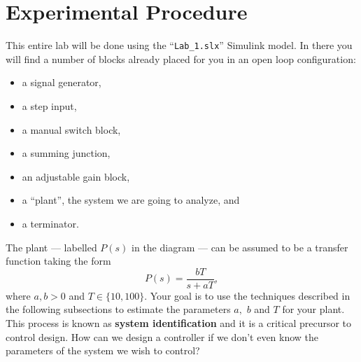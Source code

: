 \section{Experimental Procedure}
This entire lab will be done using the ``\texttt{Lab\_1.slx}'' Simulink model.
In there you will
find a number of blocks already placed for you in an open loop configuration:
\begin{itemize}
  \item{a signal generator,}
  \item{a step input,}
  \item{a manual switch block,}
  \item{a summing junction,}
  \item{an adjustable gain block,}
  \item{a ``plant'', the system we are going to analyze, and}
  \item{a terminator.}
\end{itemize}
%
The plant --- labelled \(P(s)\) in the diagram --- can be assumed to be a
transfer function taking the form
\[
  P(s) = \frac{b T}{s + a T},
\]
where \(a, b > 0\) and \(T \in \{10, 100\}.\) Your goal is to use the
techniques described in the following subsections to estimate the parameters
\(a,\) \(b\) and \(T\) for your plant. This process is known as
\textbf{system identification} and it is a critical precursor to control
design. How can we design a controller if we don't even know the parameters
of the system we wish to control?


